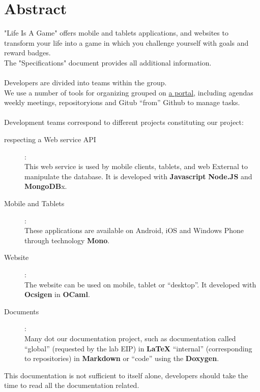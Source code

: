\documentclass{life-fr}
\begin{document}
\chapter*{Abstract}
{
  "Life Is A Game" offers mobile and tablets applications, and
  websites to transform your life into a game in which you
  challenge yourself with goals and reward badges.\\
  The "Specifications" document provides all additional information.\\
  \\
  Developers are divided into teams within the group.\\
  We use a number of tools for organizing grouped on
  \href{http://life.paysdu42.fr/}{a portal}, including agendas
  weekly meetings, repositoryions and Gitub ``from'' Github to manage
  tasks.\\
  \\
  Development teams correspond to different projects constituting
  our project: \\
  \begin{description}
    \item [respecting a Web service API]: \\
      This web service is used by mobile clients, tablets, and web
      External to manipulate the database. It is developed with
      \textbf{Javascript} \textbf{Node.JS} and \textbf{MongoDB}x.
    \item [Mobile and Tablets]: \\
      These applications are available on Android, iOS and Windows Phone
      through technology \textbf{Mono}.
    \item [Website]: \\
      The website can be used on mobile, tablet or ``desktop''. It
      developed with \textbf{Ocsigen} in \textbf{OCaml}.
    \item [Documents]: \\
      Many dot our documentation project, such as
      documentation called ``global'' (requested by the lab EIP) in
      \textbf{LaTeX} ``internal'' (corresponding to repositories) in
      \textbf{Markdown} or ``code'' using the \textbf{Doxygen}.
  \end{description}

  \vspace{10pt}
  This documentation is not sufficient to itself alone, developers
  should take the time to read all the documentation related.
}

\end{document}
